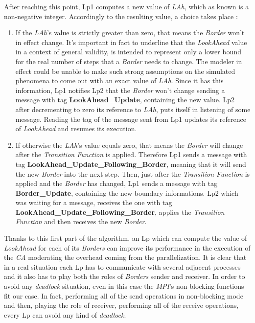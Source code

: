 \documentclass[12pt,a4paper,fleqn]{report}
\begin{document}
After reaching this point, Lp1 computes a new value of \textit{LAh}, which as known is a non-negative integer. Accordingly to the resulting value, a choice takes place : 
\begin{enumerate}
\item
If the \textit{LAh}'s value is strictly greater than zero, that means the \textit{Border} won't in effect change. It's important in fact to underline that the \textit{LookAhead} value in a context of general validity, is intended to represent only a lower bound for the real number of steps that a \textit{Border} needs to change. The modeler in effect could be unable to make such strong assumptions on the simulated phenomena to come out with an exact value of \textit{LAh}. Since it has this information, Lp1 notifies Lp2 that the \textit{Border} won't change sending a message with tag \textbf{LookAhead\_Update}, containing the new value. Lp2 after decrementing to zero its reference to \textit{LAh}, puts itself in listening of some message. Reading the tag of the message sent from Lp1 updates its reference of \textit{LookAhead} and resumes its execution.

\item
If otherwise the \textit{LAh}'s value equals zero, that means the \textit{Border} will change after the \textit{Transition Function} is applied. Therefore Lp1 sends a message with tag \textbf{LookAhead\_Update\_Following\_Border}, meaning that it will send the new \textit{Border} into the next step. Then, just after the \textit{Transition Function} is applied and the \textit{Border} has changed, Lp1 sends a message with tag \textbf{Border\_Update}, containing the new boundary informations. Lp2 which was waiting for a message, receives the one with tag \textbf{LookAhead\_Update\_Following\_Border}, applies the \textit{Transition Function} and then receives the new \textit{Border}.
\end{enumerate}
Thanks to this first part of the algorithm, an Lp which can compute the value of \textit{LookAhead} for each of its \textit{Borders} can improve its performance in the execution of the \textit{CA} moderating the overhead coming from the parallelization. It is clear that in a real situation each Lp has to communicate with several adjacent processes and it also has to play both the roles of \textit{Borders} sender and receiver. In order to avoid any \textit{deadlock} situation, even in this case the \textit{MPI}'s non-blocking functions fit our case. In fact, performing all of the send operations in non-blocking mode and then, playing the role of receiver, performing all of the receive operations, every Lp can avoid any kind of \textit{deadlock}.
\end{document}
